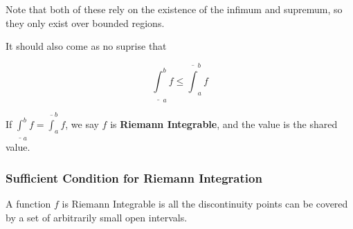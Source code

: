 \documentclass[11 pt, twoside]{article}
\begin{document}
Note that both of these rely on the existence of the infimum and supremum, so
they only exist over bounded regions.

It should also come as no suprise that

$$\underline{\int}_a^b f \leq \overline{\int}_a^b f$$

If $\underline{\int}_a^b f = \overline{\int}_a^b f$, we say $f$ is \textbf{Riemann
Integrable}, and the value is the shared value.

\subsubsection{Sufficient Condition for Riemann Integration}
A function $f$ is Riemann Integrable is all the discontinuity points can be
covered by a set of arbitrarily small open intervals.
\end{document}
